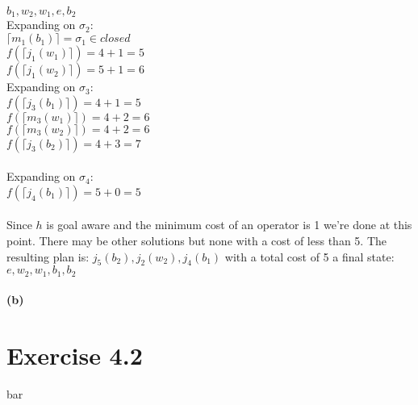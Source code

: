 \documentclass[11pt,a4paper]{article}
\begin{document}
$b_1,w_2,w_1,e,b_2$\\
Expanding on $\sigma_2$:\\
$\lceil m_1(b_1)\rceil=\sigma_1\in closed$\\
$f(\lceil j_1(w_1)\rceil)=4+1=5$\\
$f(\lceil j_1(w_2)\rceil)=5+1=6$\\
Expanding on $\sigma_3$:\\
$f(\lceil j_3(b_1)\rceil)=4+1=5$\\
$f(\lceil m_3(w_1)\rceil)=4+2=6$\\
$f(\lceil m_3(w_2)\rceil)=4+2=6$\\
$f(\lceil j_3(b_2)\rceil)=4+3=7$\\
\\
Expanding on $\sigma_4$:\\
$f(\lceil j_4(b_1)\rceil)=5+0=5$\\
\\
Since $h$ is goal aware and the minimum cost of an operator is 1 we're done at this point. There may be other solutions but none with a cost of less than 5. The resulting plan is: $j_5(b_2),j_2(w_2),j_4(b_1)$ with a total cost of 5 a final state:\\
$e,w_2,w_1,b_1,b_2$\\
\\
\textbf{(b)}

\section*{Exercise 4.2}
bar
\end{document}
